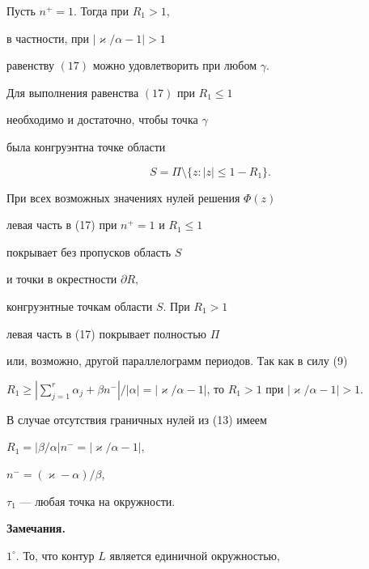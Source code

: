 \begin{thm}


Пусть $n^{+}=1$. Тогда при $R_1>1$,


в частности, при $|\varkappa/\alpha-1|>1$


равенству $(17)$ можно удовлетворить при любом $\gamma$.


Для выполнения равенства $(17)$ при $R_1 \le1$


необходимо и достаточно, чтобы точка $\gamma$


была конгруэнтна точке области


$$


S=\Pi \setminus\{z: |z|\le1-R_1\}.


$$


\end{thm}





\begin{pf}


При всех возможных значениях нулей решения $\Phi(z)$


левая часть в (17) при $n^+ =1$ и $R_1 \le1$


покрывает без пропусков область $S$


и точки в окрестности $\partial R, $


конгруэнтные точкам области $S$. При $R_1>1$


левая часть в (17) покрывает полностью $\Pi$


или, возможно, другой параллелограмм периодов. Так как в силу (9)




$R_1\ge |\sum\limits_{j=1}^{r}\alpha_{j}+\beta n^{-}|/|\alpha|=


|\varkappa/\alpha-1|$, то $R_1 >1$ при $|\varkappa/\alpha-1|>1$.


В случае отсутствия граничных нулей из (13) имеем


$R_1 = |\beta/\alpha|n^{-}=|\varkappa/\alpha - 1|$,


$n^{-} = (\varkappa -\alpha)/\beta$,


$\tau_1$ --- любая точка на окружности.


\end{pf}





{\bf Замечания.}


$1^\circ$. То, что контур $L$ является единичной окружностью,


